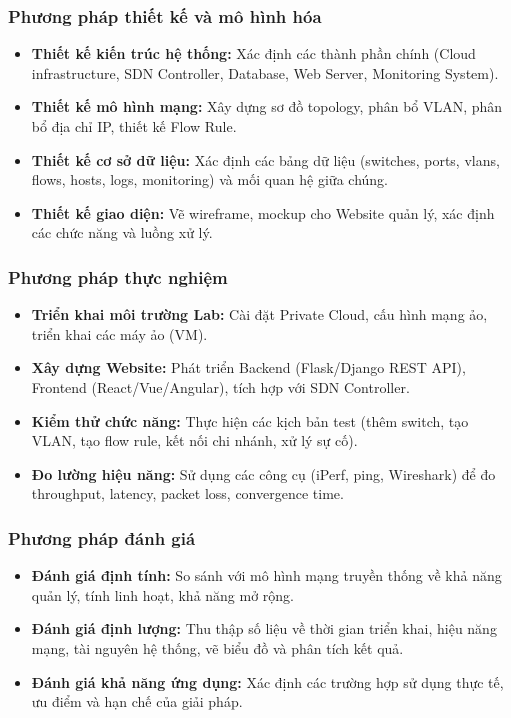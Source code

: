 \subsubsection{Phương pháp thiết kế và mô hình hóa}
\begin{itemize}
    \item \textbf{Thiết kế kiến trúc hệ thống:} Xác định các thành phần chính (Cloud infrastructure, SDN Controller, Database, Web Server, Monitoring System).
    \item \textbf{Thiết kế mô hình mạng:} Xây dựng sơ đồ topology, phân bổ VLAN, phân bổ địa chỉ IP, thiết kế Flow Rule.
    \item \textbf{Thiết kế cơ sở dữ liệu:} Xác định các bảng dữ liệu (switches, ports, vlans, flows, hosts, logs, monitoring) và mối quan hệ giữa chúng.
    \item \textbf{Thiết kế giao diện:} Vẽ wireframe, mockup cho Website quản lý, xác định các chức năng và luồng xử lý.
\end{itemize}

\subsubsection{Phương pháp thực nghiệm}
\begin{itemize}
    \item \textbf{Triển khai môi trường Lab:} Cài đặt Private Cloud, cấu hình mạng ảo, triển khai các máy ảo (VM).
    \item \textbf{Xây dựng Website:} Phát triển Backend (Flask/Django REST API), Frontend (React/Vue/Angular), tích hợp với SDN Controller.
    \item \textbf{Kiểm thử chức năng:} Thực hiện các kịch bản test (thêm switch, tạo VLAN, tạo flow rule, kết nối chi nhánh, xử lý sự cố).
    \item \textbf{Đo lường hiệu năng:} Sử dụng các công cụ (iPerf, ping, Wireshark) để đo throughput, latency, packet loss, convergence time.
\end{itemize}

\subsubsection{Phương pháp đánh giá}
\begin{itemize}
    \item \textbf{Đánh giá định tính:} So sánh với mô hình mạng truyền thống về khả năng quản lý, tính linh hoạt, khả năng mở rộng.
    \item \textbf{Đánh giá định lượng:} Thu thập số liệu về thời gian triển khai, hiệu năng mạng, tài nguyên hệ thống, vẽ biểu đồ và phân tích kết quả.
    \item \textbf{Đánh giá khả năng ứng dụng:} Xác định các trường hợp sử dụng thực tế, ưu điểm và hạn chế của giải pháp.
\end{itemize}

